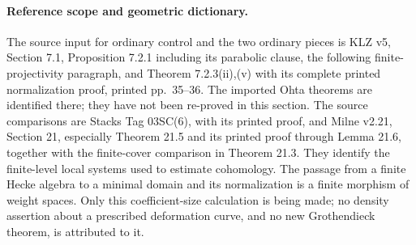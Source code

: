 \paragraph{Reference scope and geometric dictionary.}
The source input for ordinary control and the two ordinary
pieces is KLZ v5, Section 7.1, Proposition 7.2.1 including its
parabolic clause, the following finite-projectivity paragraph,
and Theorem 7.2.3(ii),(v) with its complete printed normalization
proof, printed pp.~35--36. The imported Ohta theorems are
identified there; they have not been re-proved in this section.
The source comparisons are Stacks Tag 03SC(6), with its printed
proof, and Milne v2.21, Section 21, especially Theorem 21.5
and its printed proof through Lemma 21.6, together with the
finite-cover comparison in Theorem 21.3.
They identify the finite-level local systems used to estimate
cohomology. The passage from a finite Hecke algebra to a
minimal domain and its normalization is a finite morphism of
weight spaces. Only this coefficient-size calculation is
being made; no density assertion about a prescribed
deformation curve, and no new Grothendieck theorem, is
attributed to it.
